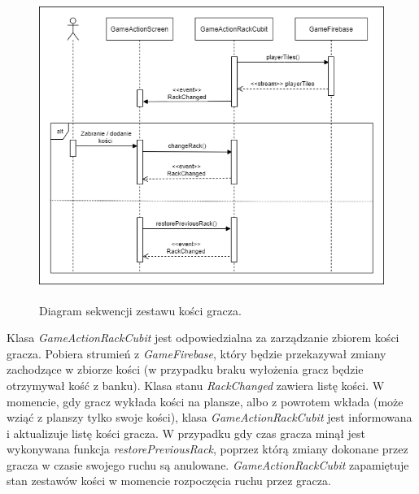 \begin{figure}[h!]
	\begin{center}
		\includegraphics[width=13cm,height=10cm]{img/diagram-sekwencji-rack.png}
	\end{center}
	\caption{{\color{dgray}Diagram sekwencji zestawu kości gracza.}} 
	\label{GameActionRackCubit}
\end{figure} 

Klasa \emph{GameActionRackCubit} jest odpowiedzialna za zarządzanie zbiorem kości gracza. Pobiera strumień z \emph{GameFirebase}, który będzie przekazywał zmiany zachodzące w zbiorze kości (w przypadku braku wyłożenia gracz będzie otrzymywał kość z banku). Klasa stanu \emph{RackChanged} zawiera listę kości. W momencie, gdy gracz wykłada kości na plansze, albo z powrotem wkłada (może wziąć z planszy tylko swoje kości), klasa \emph{GameActionRackCubit} jest informowana i aktualizuje listę kości gracza. W przypadku gdy czas gracza minął jest wykonywana funkcja \emph{restorePreviousRack}, poprzez którą zmiany dokonane przez gracza w czasie swojego ruchu są anulowane. \emph{GameActionRackCubit} zapamiętuje stan zestawów kości w momencie rozpoczęcia ruchu przez gracza.
